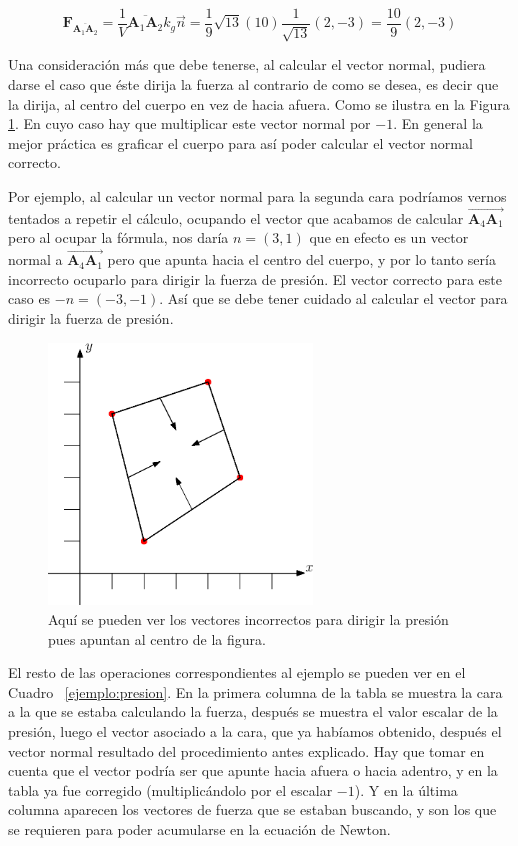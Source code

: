$$\textbf{F}_{\overline{\textbf{A}_1 \textbf{A}_2}} = \frac{1}{V}\overline{\textbf{A}_1 \textbf{A}_2} k_g \vec{n} = \frac{1}{9} \sqrt{13} \left( 10 \right)  \frac{1}{\sqrt{13}} (2, -3) = \frac{10}{9}(2, -3) $$

Una consideración más que debe tenerse, al calcular el vector normal, pudiera darse el caso que éste dirija la fuerza al contrario de como se desea, es decir que la dirija, al centro del cuerpo en vez de hacia afuera.
Como se ilustra en la Figura \ref{presionMal:fig}.
En cuyo caso hay que multiplicar este vector normal por $-1$.
En general la mejor práctica es graficar el cuerpo para así poder calcular el vector normal correcto.

Por ejemplo, al calcular un vector normal para la segunda cara podríamos vernos tentados a repetir el cálculo, ocupando el vector que acabamos de calcular $\overrightarrow{\textbf{A}_4 \textbf{A}_1}$ pero al ocupar la fórmula, nos daría $n=(3,1)$ que en efecto es un vector normal a $\overrightarrow{\textbf{A}_4 \textbf{A}_1}$ pero que apunta hacia el centro del cuerpo, y por lo tanto sería incorrecto ocuparlo para dirigir la fuerza de presión.
El vector correcto para este caso es $-n = (-3,-1)$.
Así que se debe tener cuidado al calcular el vector para dirigir la fuerza de presión.

\begin{figure}
 \centering
 \includegraphics[width=7cm]{img/01/presion_mal}
 \caption[Vectores de presión incorrectos]{ 
 Aquí se pueden ver los vectores incorrectos para dirigir la presión pues apuntan al centro de la figura.
 } \label{presionMal:fig}
\end{figure}

El resto de las operaciones correspondientes al ejemplo se pueden ver en el Cuadro ~\ref{ejemplo:presion}.
En la primera columna de la tabla se muestra la cara a la que se estaba calculando la fuerza, después se muestra el valor escalar de la presión, luego el vector asociado a la cara, que ya habíamos obtenido, después el vector normal resultado del procedimiento antes explicado.
Hay que tomar en cuenta que el vector podría ser que apunte hacia afuera o hacia adentro, y en la tabla ya fue corregido (multiplicándolo por el escalar $-1$).
Y en la última columna aparecen los vectores de fuerza que se estaban buscando, y son los que se requieren para poder acumularse en la ecuación de Newton.

